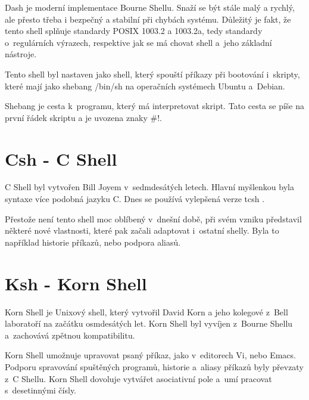 \documentclass[thesis=M,czech]{FITthesis}[2012/06/26]
\begin{document}
Dash je moderní implementace Bourne Shellu. Snaží se být stále malý a rychlý, ale přesto třeba i bezpečný a stabilní při chybách systému. Důležitý je fakt, že tento shell splňuje standardy POSIX 1003.2 a 1003.2a, tedy standardy o~regulárních výrazech, respektive jak se má chovat shell a~jeho základní nástroje.

Tento shell byl nastaven jako shell, který spouští příkazy při bootování i~skripty, které mají jako shebang /bin/sh na operačních systémech Ubuntu a~Debian.

Shebang je cesta k~programu, který má interpretovat skript. Tato cesta se píše na první řádek skriptu a je uvozena znaky $\#!$.



%
%
%
\section{Csh - C Shell}

C Shell byl vytvořen Bill Joyem v~sedmdesátých letech. Hlavní myšlenkou byla syntaxe více podobná jazyku C. Dnes se používá vylepšená verze tcsh \cite{tcsh}.

Přestože není tento shell moc oblíbený v~dnešní době, při svém vzniku představil některé nové vlastnosti, které pak začali adaptovat i~ostatní shelly. Byla to například historie příkazů, nebo podpora aliasů.




%
%
%
\section{Ksh - Korn Shell}

Korn Shell \cite{ksh} je Unixový shell, který vytvořil David Korn a jeho kolegové z~Bell laboratoří na začátku osmdesátých let. Korn Shell byl vyvíjen z~Bourne Shellu a~zachovává zpětnou kompatibilitu.

Korn Shell umožnuje upravovat psaný příkaz, jako v~editorech Vi, nebo Emacs. Podporu spravování spuštěných programů, historie a~aliasy příkazů byly převzaty z~C Shellu. Korn Shell dovoluje vytvářet asociativní pole a~umí pracovat s~desetinnými čísly.
\end{document}
